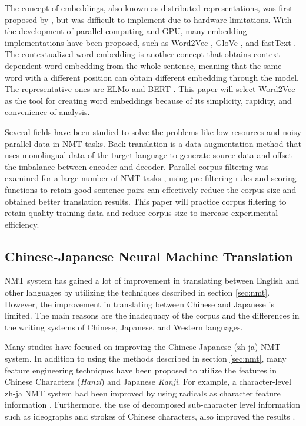 The concept of embeddings, also known as distributed representations, was first proposed by \cite{hinton1986learning, bengio2003neural}, but was difficult to implement due to hardware limitations. With the development of parallel computing and GPU, many embedding implementations have been proposed, such as Word2Vec \cite{mikolov2013efficient}, GloVe \cite{pennington2014glove}, and fastText \cite{bojanowski2017enriching}. The contextualized word embedding is another concept that obtains context-dependent word embedding from the whole sentence, meaning that the same word with a different position can obtain different embedding through the model. The representative ones are ELMo \cite{peters-etal-2018-deep} and BERT \cite{devlin-etal-2019-bert}. This paper will select Word2Vec \cite{mikolov2013efficient} as the tool for creating word embeddings because of its simplicity, rapidity, and convenience of analysis.

Several fields have been studied to solve the problems like low-resources and noisy parallel data in NMT tasks. Back-translation \cite{sennrich-etal-2016-improving} is a data augmentation method that uses monolingual data of the target language to generate source data and offset the imbalance between encoder and decoder. Parallel corpus filtering was examined for a large number of NMT tasks \cite{koehn2018findings}, using pre-filtering rules and scoring functions to retain good sentence pairs can effectively reduce the corpus size and obtained better translation results. This paper will practice corpus filtering to retain quality training data and reduce corpus size to increase experimental efficiency.

\subsection{Chinese-Japanese Neural Machine Translation}

NMT system has gained a lot of improvement in translating between English and other languages by utilizing the techniques described in section \ref{sec:nmt}. However, the improvement in translating between Chinese and Japanese is limited. The main reasons are the inadequacy of the corpus and the differences in the writing systems of Chinese, Japanese, and Western languages.

Many studies have focused on improving the Chinese-Japanese (zh-ja) NMT system. In addition to using the methods \cite{imamura2018enhancement, chu2017empirical, zhang2020parallel} described in section \ref{sec:nmt}, many feature engineering techniques have been proposed to utilize the features in Chinese Characters (\textit{Hanzi}) and Japanese \textit{Kanji}. For example, a character-level zh-ja NMT system had been improved by using radicals as character feature information \cite{8300572}. Furthermore, the use of decomposed sub-character level information such as ideographs and strokes of Chinese characters, also improved the results \cite{zhang-komachi-2018-neural}.

